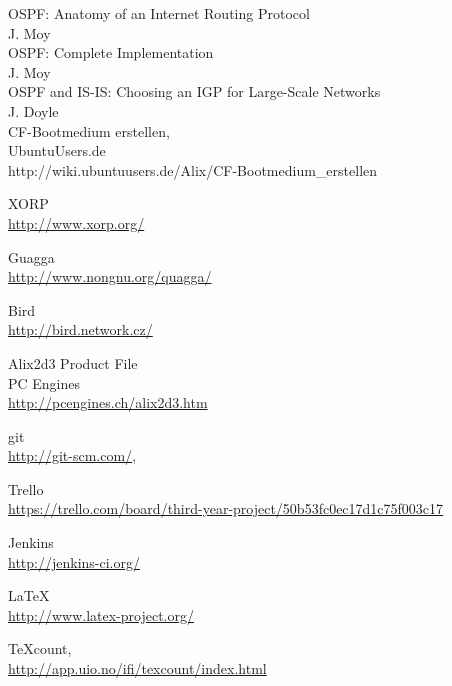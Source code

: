 \documentclass[12pt]{report}
\begin{document}
\begin{thebibliography}{9}
	OSPF: Anatomy of an Internet Routing Protocol\\
	J. Moy\\

	OSPF: Complete Implementation\\
	J. Moy\\

	OSPF and IS-IS: Choosing an IGP for Large-Scale Networks\\
	J. Doyle\\

	CF-Bootmedium erstellen,\\
	UbuntuUsers.de\\
	http://wiki.ubuntuusers.de/Alix/CF-Bootmedium\_erstellen


	XORP\\
	\url{http://www.xorp.org/}

	Guagga\\
	\url{http://www.nongnu.org/quagga/}

	Bird\\
	\url{http://bird.network.cz/}


	Alix2d3 Product File\\
	PC Engines\\
	\url{http://pcengines.ch/alix2d3.htm}


	git \\
	\url{http://git-scm.com/},

	Trello \\
	\url{https://trello.com/board/third-year-project/50b53fc0ec17d1c75f003c17}

	Jenkins\\
	\url{http://jenkins-ci.org/}

	\LaTeX \\
	\url{http://www.latex-project.org/}

	TeXcount,\\
	\url{http://app.uio.no/ifi/texcount/index.html}

\end{thebibliography}
\end{document}

